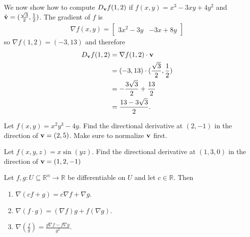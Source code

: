 \documentclass[12pt,letterpaper,reqno]{article}
\numberwithin{equation}{section}
\newcommand{\R}{\ensuremath{\mathbb R}}
\newcommand{\bv}{{\bf v}}
\begin{document}
{\begin{example}
We now show how to compute $D_{\bv}f(1,2)$ if  $f(x,y)=x^3-3xy+4y^2$ and $\hat{\bv}=(\frac{\sqrt{3}}{2},\frac{1}{2})$.	 The gradient of $f$ is 
\begin{align*}
	\nabla f(x,y)=\begin{bmatrix}
		3x^2-3y & -3x+8y
	\end{bmatrix}
\end{align*}
so $\nabla f(1,2)=(-3,13)$ and therefore
\begin{align*}
	D_\bv f(1,2)&=\nabla f(1,2) \cdot \bv \\
	&=(-3,13) \cdot (\frac{\sqrt{3}}{2},\frac{1}{2}) \\
	&=-\frac{3\sqrt{3}}{2}+\frac{13}{2} \\
	&=\frac{13-3\sqrt{3}}{2}.
\end{align*}
\end{example}

\begin{exercise}
Let $f(x,y)=x^2y^3-4y$. Find the directional derivative at $(2,-1)$ in the direction of $\bv=(2,5)$. Make sure to normalize $\bv$ first.	
\end{exercise}

\begin{exercise}
Let $f(x,y,z)=x \sin(yz)$. Find the directional derivative at $(1,3,0)$ in the direction of $\bv=(1,2,-1)$ 	
\end{exercise}

\begin{thm}\label{thm:algebraic_properties_of_the_gradient}
Let $f,g:U \subseteq \R^n \to \R$ be differentiable on $U$ and let $c \in \R$. Then
	\begin{enumerate}
		\item $\nabla (cf+g)=c \nabla f+ \nabla g$.
		\item $\nabla(f \cdot g)=(\nabla f)g+f(\nabla g)$.
		\item $\nabla\left(\frac{f}{g}\right)=\frac{g \nabla f-f \nabla g}{g^2}$.
	\end{enumerate}
\end{thm}

}
\end{document}
